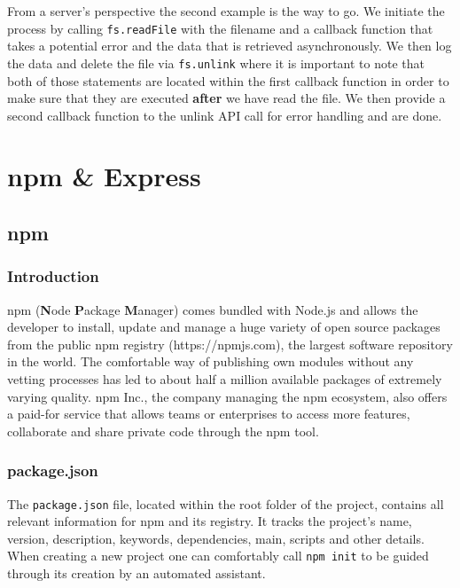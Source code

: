 \documentclass{bioinfo}
\begin{document}
From a server's perspective the second example is the way to go. We initiate the process by calling \texttt{fs.readFile} with the filename and a callback function that takes a potential error and the data that is retrieved asynchronously. We then log the data and delete the file via \texttt{fs.unlink} where it is important to note that both of those statements are located within the first callback function in order to make sure that they are executed \textbf{after} we have read the file. We then provide a second callback function to the unlink API call for error handling and are done. 

\section{npm \& Express}
\subsection{npm}
\subsubsection{Introduction}
npm (\textbf{N}ode \textbf{P}ackage \textbf{M}anager) comes bundled with Node.js and allows the developer to install, update and manage a huge variety of open source packages from the public npm registry (https://npmjs.com), the largest software repository in the world. The comfortable way of publishing own modules without any vetting processes has led to about half a million available packages of extremely varying quality. \cite{npmwikipedia} npm Inc., the company managing the npm ecosystem, also offers a paid-for service that allows teams or enterprises to access more features, collaborate and share private code through the npm tool. \cite{npmabout}     

\subsubsection{package.json}
The \texttt{package.json} file, located within the root folder of the project, contains all relevant information for npm and its registry. It tracks the project's name, version, description, keywords, dependencies, main, scripts and other details. \cite{npmpackage} When creating a new project one can comfortably call \texttt{npm init} to be guided through its creation by an automated assistant. 
\end{document}
